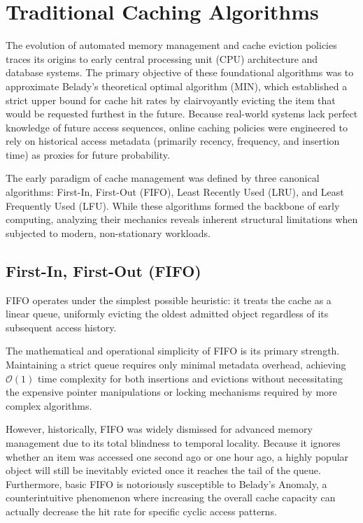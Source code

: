 \section{Traditional Caching Algorithms}
The evolution of automated memory management and cache eviction policies traces its origins to early central processing unit (CPU) architecture and database systems. The primary objective of these foundational algorithms was to approximate Belady’s theoretical optimal algorithm (MIN), which established a strict upper bound for cache hit rates by clairvoyantly evicting the item that would be requested furthest in the future. Because real-world systems lack perfect knowledge of future access sequences, online caching policies were engineered to rely on historical access metadata (primarily recency, frequency, and insertion time) as proxies for future probability.

The early paradigm of cache management was defined by three canonical algorithms: First-In, First-Out (FIFO), Least Recently Used (LRU), and Least Frequently Used (LFU). While these algorithms formed the backbone of early computing, analyzing their mechanics reveals inherent structural limitations when subjected to modern, non-stationary workloads.

\subsection{First-In, First-Out (FIFO)}
FIFO operates under the simplest possible heuristic: it treats the cache as a linear queue, uniformly evicting the oldest admitted object regardless of its subsequent access history. 

The mathematical and operational simplicity of FIFO is its primary strength. Maintaining a strict queue requires only minimal metadata overhead, achieving $\mathcal{O}(1)$ time complexity for both insertions and evictions without necessitating the expensive pointer manipulations or locking mechanisms required by more complex algorithms. 

However, historically, FIFO was widely dismissed for advanced memory management due to its total blindness to temporal locality. Because it ignores whether an item was accessed one second ago or one hour ago, a highly popular object will still be inevitably evicted once it reaches the tail of the queue. Furthermore, basic FIFO is notoriously susceptible to Belady’s Anomaly, a counterintuitive phenomenon where increasing the overall cache capacity can actually decrease the hit rate for specific cyclic access patterns.

